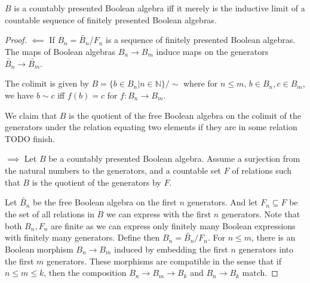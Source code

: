 
\begin{lemma}
  $B$ is a countably presented Boolean algebra iff 
  it merely is the inductive limit of a countable sequence of finitely presented Boolean algebras.
\end{lemma} 

\begin{proof}
  \item[$\impliedby$] 
    If $B_n  = \widetilde {B_n} / F_n$ is a sequence of finitely presented Boolean algebras.
    The maps of Boolean algebras $B_n\to B_m$ induce maps on the generators $ \widetilde {B_n} \to \widetilde{B_m}$. 

    The colimit is given by 
    $B = \{ b \in B_n | n\in\mathbb N \} / \sim$ where for $n\leq m$, $ b\in B_n, c \in B_m$, 
    we have $b \sim c$ iff $f(b)=c$ for $f:B_n \to B_m$. 

    We claim that $B$ is the quotient of the free Boolean algebra on 
    the colimit of the generators under the relation equating two elements 
    if they are in some relation 
    TODO finish. 

    
  \item[$\implies$] Let $B$ be a countably presented Boolean algebra. 
    Assume a surjection from the natural numbers to the generators, 
    and a countable set $F$ of relations such that $B$ is the quotient of the generators by $F$. 
    \medskip 

    Let $\widetilde{B_n}$ be the free Boolean algebra on the first $n$ generators. 
    And let $F_n\subseteq F$ be the set of all relations in $B$ we can express with the first $n$ generators. 
    Note that both $B_n,F_n$ are finite as we can express only finitely many 
    Boolean expressions with finitely many generators. 
    Define then $B_n = \widetilde {B_n} / F_n$. 
    For $n\leq m$, there is an Boolean morphism $B_n\to B_m$ induced by embedding the 
    first $n$ generators into the first $m$ generators.
    These morphisms are compatible in the sense that if $n\leq m \leq k$, then 
    the composition $B_n \to B_m \to B_k$ and $B_n \to B_k$ match. 


\end{proof}
